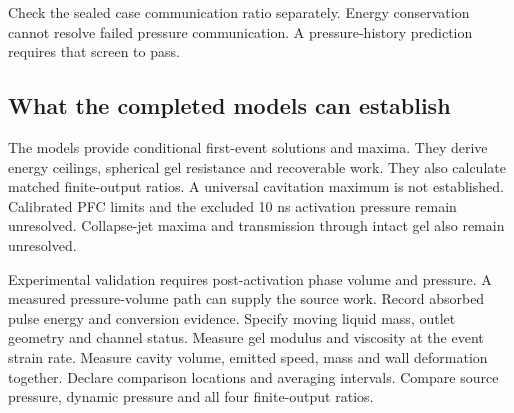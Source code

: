 \documentclass[11pt]{article}
\begin{document}
Check the sealed case communication ratio separately. Energy conservation cannot resolve failed pressure communication. A pressure-history prediction requires that screen to pass.



\subsection*{What the completed models can establish}

The models provide conditional first-event solutions and maxima. They derive energy ceilings, spherical gel resistance and recoverable work. They also calculate matched finite-output ratios. A universal cavitation maximum is not established. Calibrated PFC limits and the excluded 10 ns activation pressure remain unresolved. Collapse-jet maxima and transmission through intact gel also remain unresolved.


Experimental validation requires post-activation phase volume and pressure. A measured pressure-volume path can supply the source work. Record absorbed pulse energy and conversion evidence. Specify moving liquid mass, outlet geometry and channel status. Measure gel modulus and viscosity at the event strain rate. Measure cavity volume, emitted speed, mass and wall deformation together. Declare comparison locations and averaging intervals. Compare source pressure, dynamic pressure and all four finite-output ratios.
\end{document}
